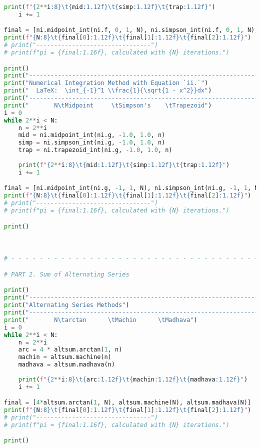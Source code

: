 \documentclass[11pt]{article}
\begin{document}
\begin{lstlisting}[language=Python]
    print(f"{2**i:8}\t{mid:1.12f}\t{simp:1.12f}\t{trap:1.12f}")
    i += 1

final = [ni.midpoint_int(ni.f, 0, 1, N), ni.simpson_int(ni.f, 0, 1, N), ni.trapezoid_int(ni.f, 0, 1, N)]
print(f"{N:8}\t{final[0]:1.12f}\t{final[1]:1.12f}\t{final[2]:1.12f}")
# print("--------------------------------")
# print(f"pi = {final:1.16f}, calculated with {N} iterations.")

print()
print("----------------------------------------------------------------")
print("Numerical Integration Method with Equation `ii.`")
print("  LaTeX:  \int_{-1}^1 \\frac{1}{\sqrt{1 - x^2}}dx")
print("----------------------------------------------------------------")
print("       N\tMidpoint     \tSimpson's    \tTrapezoid")
i = 0
while 2**i < N:
    n = 2**i
    mid = ni.midpoint_int(ni.g, -1.0, 1.0, n)
    simp = ni.simpson_int(ni.g, -1.0, 1.0, n)
    trap = ni.trapezoid_int(ni.g, -1.0, 1.0, n)
    
    print(f"{2**i:8}\t{mid:1.12f}\t{simp:1.12f}\t{trap:1.12f}")
    i += 1

final = [ni.midpoint_int(ni.g, -1, 1, N), ni.simpson_int(ni.g, -1, 1, N), ni.trapezoid_int(ni.g, -1, 1, N)]
print(f"{N:8}\t{final[0]:1.12f}\t{final[1]:1.12f}\t{final[2]:1.12f}")
# print("--------------------------------")
# print(f"pi = {final:1.16f}, calculated with {N} iterations.")

print()



# - - - - - - - - - - - - - - - - - - - - - - - - - - - - - - - - - - - - - - -

# PART 2. Sum of Alternating Series

print()
print("----------------------------------------------------------------")
print("Alternating Series Methods")
print("----------------------------------------------------------------")
print("       N\tarctan      \tMachin      \tMadhava")
i = 0
while 2**i < N:
    n = 2**i
    arc = 4 * altsum.arctan(1, n)
    machin = altsum.machine(n)
    madhava = altsum.madhava(n)
    
    print(f"{2**i:8}\t{arc:1.12f}\t{machin:1.12f}\t{madhava:1.12f}")
    i += 1

final = [4*altsum.arctan(1, N), altsum.machine(N), altsum.madhava(N)]
print(f"{N:8}\t{final[0]:1.12f}\t{final[1]:1.12f}\t{final[2]:1.12f}")
# print("--------------------------------")
# print(f"pi = {final:1.16f}, calculated with {N} iterations.")

print()




\end{lstlisting}
\end{document}
